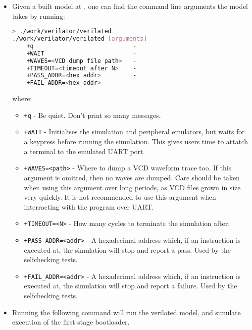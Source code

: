\begin{itemize}

\item Given a built model at 
    ,
    one can find the command line arguments the model takes by running:

\begin{lstlisting}[language=bash,style=block]
> ./work/verilator/verilated
./work/verilator/verilated [arguments]
	+q                            -
	+WAIT                         -
	+WAVES=<VCD dump file path>   -
	+TIMEOUT=<timeout after N>    -
	+PASS_ADDR=<hex addr>         -
	+FAIL_ADDR=<hex addr>         -
\end{lstlisting}

    where:
    \begin{itemize}
    \item {\tt +q} - Be quiet. Don't print so many messages.
    \item {\tt +WAIT} - Initialises the simulation and peripheral
        emulators, but waits for a keypress before running the simulation.
        This gives users time to attatch a terminal to the emulated UART
        port.
    \item {\tt +WAVES=<path>} - Where to dump a VCD waveform trace too.
        If this argument is omitted, then no waves are dumped.
        Care should be taken when using this argument over long periods,
        as VCD files grown in size very quickly.
        It is not recommended to use this argument when interracting
        with the program over UART.
    \item {\tt +TIMEOUT=<N>} - How many cycles to terminate the
        simulation after.
    \item {\tt +PASS\_ADDR=<addr>} - A hexadecimal address which, if
        an instruction is executed at, the simulation will stop and
        report a pass. Used by the selfchecking tests.
    \item {\tt +FAIL\_ADDR=<addr>} - A hexadecimal address which, if
        an instruction is executed at, the simulation will stop and
        report a failure. Used by the selfchecking tests.
    \end{itemize}

\item Running the following command will run the verilated model,
    and simulate execution of the first stage bootloader.


\end{itemize}
